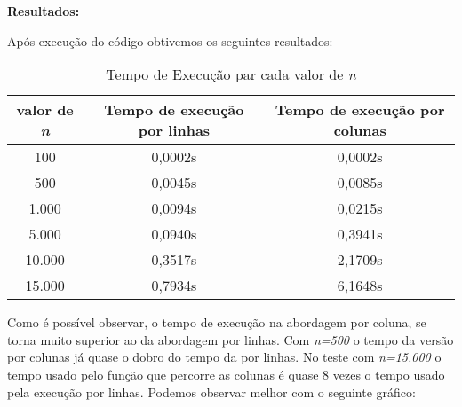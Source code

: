 \documentclass[a4paper, 12pt]{article}
\begin{document}
	
	\textbf{Resultados:}
	
	Após execução do código obtivemos os seguintes resultados:
	
	\begin{table}[ht]
		\centering
		\begin{tabular}{|c|c|c|}
			\hline
			\textbf{valor de \textit{n}} & \textbf{Tempo de execução por linhas} & \textbf{Tempo de execução por colunas}  \\
			\hline
			100 & 0,0002s & 0,0002s \\
			500 & 0,0045s & 0,0085s \\
			1.000 & 0,0094s & 0,0215s \\
			5.000 & 0,0940s & 0,3941s \\
			10.000 & 0,3517s & 2,1709s \\
			15.000 & 0,7934s & 6,1648s \\
			\hline
		\end{tabular}
		\caption{Tempo de Execução par cada valor de \textit{n}}
	\end{table}
	
	Como é possível observar, o tempo de execução na abordagem por coluna, se torna muito superior ao da abordagem por linhas. Com \textit{n=500} o tempo da versão por colunas já quase o dobro do tempo da por linhas. No teste com \textit{n=15.000} o tempo usado pelo função que percorre as colunas é quase 8 vezes o tempo usado pela execução por linhas. Podemos observar melhor com o seguinte gráfico:
	
	
\end{document}
